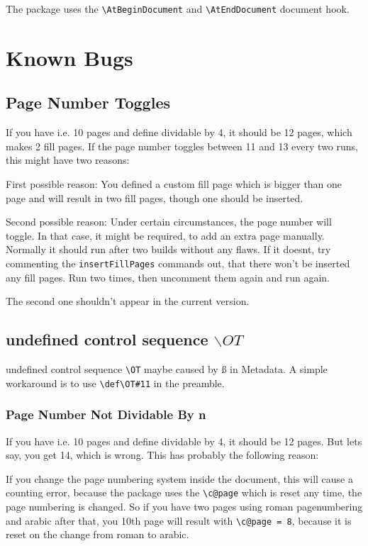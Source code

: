 \documentclass[12pt,a4paper]{scrreprt}
\begin{document}
The package uses the \verb+\AtBeginDocument+ and \verb+\AtEndDocument+ document hook.

\chapter{Known Bugs}
\section{Page Number Toggles}
If you have i.e. 10 pages and define dividable by 4, it should be 12 pages, which makes 2 fill pages. If the page number toggles between 11 and 13 every two runs, this might have two reasons:

First possible reason: You defined a custom fill page which is bigger than one page and will result in two fill pages, though one should be inserted.

Second possible reason: Under certain circumstances, the page number will toggle. In that case, it might be required, to add an extra page manually. Normally it should run after two builds without any flaws. If it doesnt, try commenting the \verb+insertFillPages+ commands out, that there won't be inserted any fill pages. Run two times, then uncomment them again and run again.

The second one shouldn't appear in the current version.


\section{undefined control sequence $\backslash OT$}
undefined control sequence \verb+\OT+ maybe caused by ß in Metadata. A simple workaround is to use \verb+\def\OT#11+ in the preamble.

\subsection{Page Number Not Dividable By n}
If you have i.e. 10 pages and define dividable by 4, it should be 12 pages. But lets say, you get 14, which is wrong. This has probably the following reason:

If you change the page numbering system inside the document, this will cause a counting error, because the package uses the \verb+\c@page+ which is reset any time, the page numbering is changed. So if you have two pages using roman pagenumbering and arabic after that, you 10th page will result with \verb+\c@page = 8+, because it is reset on the change from roman to arabic.
\end{document}
